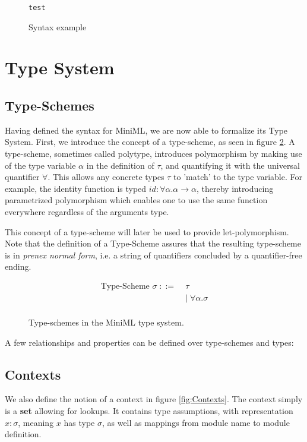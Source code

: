 \documentclass[10pt,a4paper,draft]{article}
\begin{document}
\begin{flushleft}
\begin{figure}[!htbp]
\begin{verbatim}
test
\end{verbatim}
\caption{Syntax example}
\label{code:SyntaxExample}
\end{figure}

\section{Type System}

\subsection{Type-Schemes}
Having defined the syntax for MiniML, we are now able to formalize its Type System. First, we introduce the concept of a type-scheme, as seen in figure \ref{fig:Type-schemes}. A type-scheme, sometimes called polytype, introduces polymorphism by making use of the type variable $\alpha$ in the definition of $\tau$, and quantifying it with the universal quantifier $\forall$. This allows any concrete types $\tau$ to 'match' to the type variable. For example, the identity function  is typed $id:\forall \alpha. \alpha \rightarrow \alpha$, thereby introducing parametrized polymorphism which enables one to use the same  function everywhere regardless of the arguments type.

This concept of a type-scheme will later be used to provide let-polymorphism.  Note that the definition of a Type-Scheme assures that the resulting type-scheme is in \emph{prenex normal form}, i.e. a string of quantifiers concluded by a quantifier-free ending.

\begin{figure}[!htbp]
\begin{align*}
\text{Type-Scheme } \sigma \; ::= \; &\tau \\
&| \; \forall \alpha . \sigma \\
\end{align*}
\caption{Type-schemes in the MiniML type system.}
\label{fig:Type-schemes}
\end{figure}

A few relationships and properties can be defined over type-schemes and types: 

\subsection{Contexts}
We also define the notion of a context in figure \ref{fig:Contexts}. The context simply is a \textbf{set} allowing for lookups. It contains type assumptions, with representation $x:\sigma$, meaning $x$ has type $\sigma$, as well as mappings from module name to module definition.


\end{flushleft}
\end{document}
